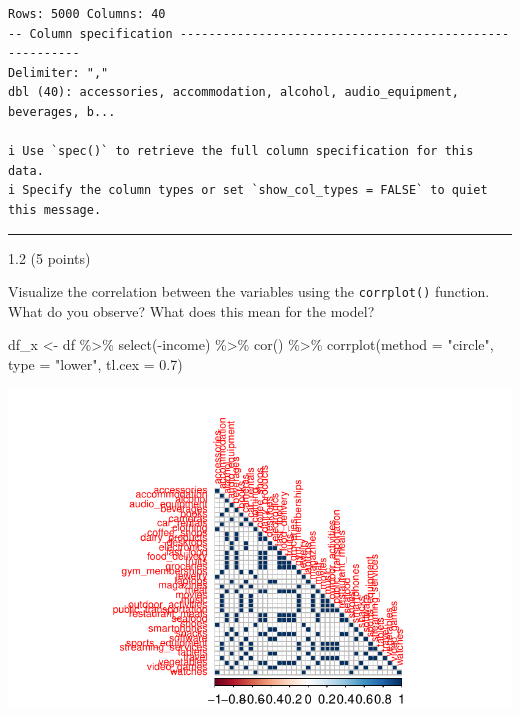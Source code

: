 \documentclass[
  letterpaper,
  DIV=11,
  numbers=noendperiod]{scrartcl}
\newenvironment{Shaded}{\begin{snugshade}}{\end{snugshade}}
\newcommand{\AttributeTok}[1]{\textcolor[rgb]{0.40,0.45,0.13}{#1}}
\newcommand{\FloatTok}[1]{\textcolor[rgb]{0.68,0.00,0.00}{#1}}
\newcommand{\FunctionTok}[1]{\textcolor[rgb]{0.28,0.35,0.67}{#1}}
\newcommand{\NormalTok}[1]{\textcolor[rgb]{0.00,0.23,0.31}{#1}}
\newcommand{\OtherTok}[1]{\textcolor[rgb]{0.00,0.23,0.31}{#1}}
\newcommand{\SpecialCharTok}[1]{\textcolor[rgb]{0.37,0.37,0.37}{#1}}
\newcommand{\StringTok}[1]{\textcolor[rgb]{0.13,0.47,0.30}{#1}}
\begin{document}
\begin{verbatim}
Rows: 5000 Columns: 40
-- Column specification --------------------------------------------------------
Delimiter: ","
dbl (40): accessories, accommodation, alcohol, audio_equipment, beverages, b...

i Use `spec()` to retrieve the full column specification for this data.
i Specify the column types or set `show_col_types = FALSE` to quiet this message.
\end{verbatim}

\begin{center}\rule{0.5\linewidth}{0.5pt}\end{center}

1.2 (5 points)

Visualize the correlation between the variables using the
\texttt{corrplot()} function. What do you observe? What does this mean
for the model?

\begin{Shaded}
\begin{Highlighting}[]
\NormalTok{df\_x }\OtherTok{\textless{}{-}}\NormalTok{ df }\SpecialCharTok{\%\textgreater{}\%}
  \FunctionTok{select}\NormalTok{(}\SpecialCharTok{{-}}\NormalTok{income) }\SpecialCharTok{\%\textgreater{}\%}
  \FunctionTok{cor}\NormalTok{() }\SpecialCharTok{\%\textgreater{}\%}
  \FunctionTok{corrplot}\NormalTok{(}\AttributeTok{method =} \StringTok{"circle"}\NormalTok{, }\AttributeTok{type =} \StringTok{"lower"}\NormalTok{, }\AttributeTok{tl.cex =} \FloatTok{0.7}\NormalTok{)}
\end{Highlighting}
\end{Shaded}

\includegraphics{hw6_files/figure-pdf/unnamed-chunk-3-1.pdf}
\end{document}
